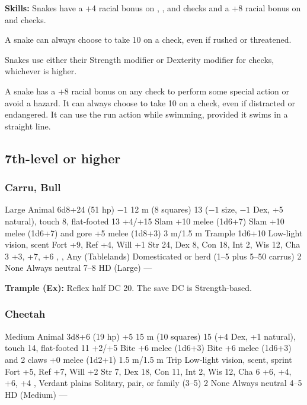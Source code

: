 \textbf{Skills:} Snakes have a +4 racial bonus on , , and  checks and a +8 racial bonus on  and  checks.

A snake can always choose to take 10 on a  check, even if rushed or threatened.

Snakes use either their Strength modifier or Dexterity modifier for  checks, whichever is higher.

A snake has a +8 racial bonus on any  check to perform some special action or avoid a hazard. It can always choose to take 10 on a  check, even if distracted or endangered. It can use the run action while swimming, provided it swims in a straight line.

\subsection{7th-level or higher}
\subsubsection{Carru, Bull}
\begin{MonsterStats}
{Large Animal}
{6d8+24 (51 hp)}
{$-1$}
{12 m (8 squares)}
{13 ($-1$ size, $-1$ Dex, +5 natural), touch 8, flat-footed 13}
{+4/+15}
{Slam +10 melee (1d6+7)}
{Slam +10 melee (1d6+7) and gore +5 melee (1d8+3)}
{3 m/1.5 m}
{Trample 1d6+10}
{Low-light vision, scent}
{Fort +9, Ref +4, Will +1}
{Str 24, Dex 8, Con 18, Int 2, Wis 12, Cha 3}
{ +3,  +7,  +6}
{, , }
{Any (Tablelands)}
{Domesticated or herd (1--5 plus 5--50 carrus)}
{2}
{None}
{Always neutral}
{7--8 HD (Large)}
{---}
\end{MonsterStats}

\textbf{Trample (Ex):} Reflex half DC 20. The save DC is Strength-based.

\subsubsection{Cheetah}
\begin{MonsterStats}
{Medium Animal}
{3d8+6 (19 hp)}
{+5}
{15 m (10 squares)}
{15 (+4 Dex, +1 natural), touch 14, flat-footed 11}
{+2/+5}
{Bite +6 melee (1d6+3)}
{Bite +6 melee (1d6+3) and 2 claws +0 melee (1d2+1)}
{1.5 m/1.5 m}
{Trip}
{Low-light vision, scent, sprint}
{Fort +5, Ref +7, Will +2}
{Str 7, Dex 18, Con 11, Int 2, Wis 12, Cha 6}
{ +6,  +4,  +6,  +4}
{, }
{Verdant plains}
{Solitary, pair, or family (3--5)}
{2}
{None}
{Always neutral}
{4--5 HD (Medium)}
{---}
\end{MonsterStats}

